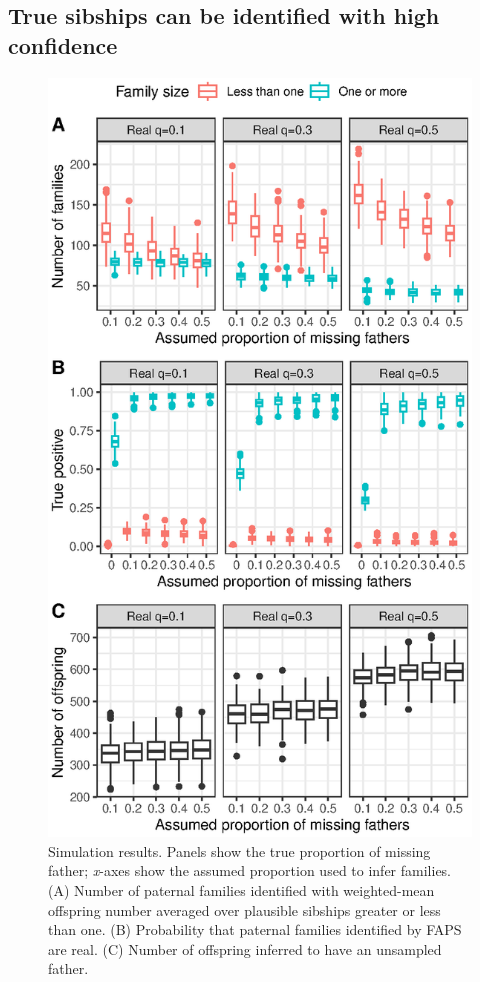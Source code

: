 \documentclass[10pt, a4paper, twocolumn]{article} %
\begin{document}
\subsection{True sibships can be identified with high confidence}

\begin{figure}
    \centering
    \includegraphics{simulations.eps}
    \caption{
        Simulation results.
        Panels show the true proportion of missing father; \textit{x}-axes show the assumed proportion used to infer families.
        (A) Number of paternal families identified with weighted-mean offspring number averaged over plausible sibships greater or less than one.
        (B) Probability that paternal families identified by FAPS are real.
        (C) Number of offspring inferred to have an unsampled father.
    }
    \label{fig:simulations}
\end{figure}
\end{document}
